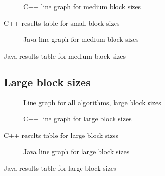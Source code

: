 \begin{figure}
    \centering
    
    \caption{C++ line graph for medium block sizes}
    \label{fig:cpp:line:medium}
\end{figure}
\begin{table}
    \centering
    \caption{C++ results table for small block sizes}
    \label{tab:cpp:medium}
    \resizebox{\columnwidth}{!}{
        
    }
\end{table}


\begin{figure}
    \centering
    
    \caption{Java line graph for medium block sizes}
    \label{fig:java:line:medium}
\end{figure}
\begin{table}
    \centering
    \caption{Java results table for medium block sizes}
    \label{tab:java:medium}
    
\end{table}

\subsection{Large block sizes}

\begin{figure}
    \centering
    
    \caption{Line graph for all algorithms, large block sizes}
    \label{fig:all:line:large}
\end{figure}

\begin{figure}
    \centering
    
    \caption{C++ line graph for large block sizes}
    \label{fig:cpp:line:large}
\end{figure}
\begin{table}
    \centering
    \caption{C++ results table for large block sizes}
    \label{tab:cpp:large}
    \resizebox{\columnwidth}{!}{
        
    }
\end{table}


\begin{figure}
    \centering
    
    \caption{Java line graph for large block sizes}
    \label{fig:java:line:large}
\end{figure}
\begin{table}
    \centering
    \caption{Java results table for large block sizes}
    \label{tab:java:large}
    
\end{table}


